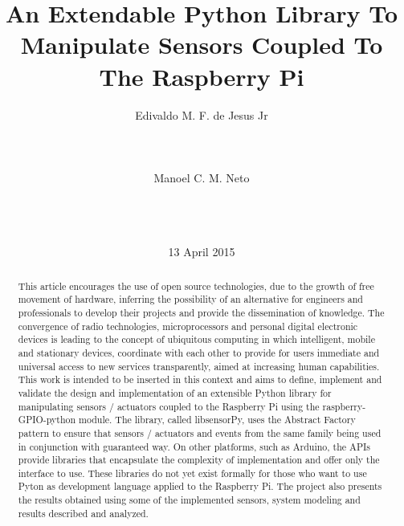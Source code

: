 \documentclass{acm_proc_article-sp}
\begin{document}
\title{An Extendable Python Library To Manipulate Sensors Coupled To The Raspberry Pi}

\author{
\alignauthor
Edivaldo M. F. de Jesus Jr\\
       \\
       \\
       \\
\alignauthor
Manoel C. M. Neto\\
       \\
       \\
       \\
}

\date{13 April 2015}

\maketitle
\begin{abstract}

This article encourages the use of open source technologies, due to the growth of free movement of hardware, inferring the possibility of an alternative for engineers and professionals to develop their projects and provide the dissemination of knowledge.
The convergence of radio technologies, microprocessors and personal digital electronic devices is leading to the concept of ubiquitous computing in which intelligent, mobile and stationary devices, coordinate with each other to provide for users immediate and universal access to new services transparently, aimed at increasing human capabilities. This work is intended to be inserted in this context and aims to define, implement and validate the design and implementation of an extensible Python library for manipulating sensors / actuators coupled to the Raspberry Pi using the raspberry-GPIO-python module. The library, called libsensorPy, uses the Abstract Factory pattern to ensure that sensors / actuators and events from the same family being used in conjunction with guaranteed way. On other platforms, such as Arduino, the APIs provide libraries that encapsulate the complexity of implementation and offer only the interface to use. These libraries do not yet exist formally for those who want to use Pyton as development language applied to the Raspberry Pi.  The project also presents the results obtained using some of the implemented sensors, system modeling and results described and analyzed.

\end{abstract}
\end{document}
